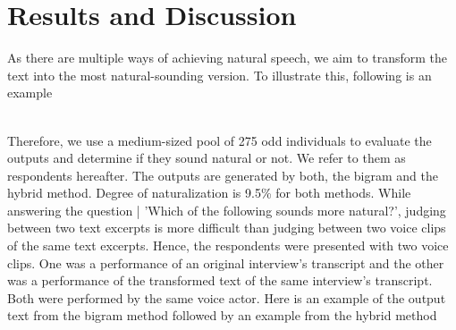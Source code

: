 \documentclass[journal]{IEEEtran}
\begin{document}
\section{Results and Discussion}

As there are multiple ways of achieving natural speech, we aim to transform the text into the most natural-sounding version. To illustrate this, following is an example

\noindent{}
\\

Therefore, we use a medium-sized pool of 275 odd individuals to evaluate the outputs and determine if they sound natural or not. We refer to them as respondents hereafter. The outputs are generated by both, the bigram and the hybrid method. Degree of naturalization is 9.5\% for both methods. While answering the question | 'Which of the following sounds more natural?', judging between two text excerpts is more difficult than judging between two voice clips of the same text excerpts. Hence, the respondents were presented with two voice clips. One was a performance of an original interview's transcript and the other was a performance of the transformed text of the same interview's transcript. Both were performed by the same voice actor. Here is an example of the output text from the bigram method followed by an example from the hybrid method


\noindent{}
\\


\noindent{}
\\
\end{document}
